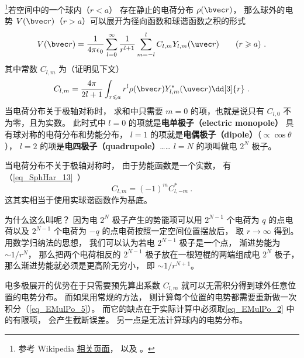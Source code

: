 

\footnote{参考 Wikipedia \href{https://en.wikipedia.org/wiki/Multipole_expansion}{相关页面}， 以及 \cite{Jackson}。}若空间中的一个球内（$r < a$） 存在静止的电荷分布 $\rho(\bvec r)$， 那么球外的电势 $V(\bvec r)$（$r > a$）可以展开为径向函数和球谐函数之积的形式
\begin{equation}\label{eq_EMulPo_2}
V(\bvec r) = \frac{1}{4\pi\epsilon_0}\sum_{l = 0}^\infty \frac{1}{r^{l+1}}\sum_{m = -l}^l C_{l,m} Y_{l,m}(\uvec r) \qquad (r \geqslant a)~.
\end{equation}
其中常数 $C_{l,m}$ 为（证明见下文）
\begin{equation}
C_{l,m} = \frac{4\pi}{2l+1} \int_{r\leqslant a} r^l \rho(\bvec r) Y_{l,m}^*(\uvec r) \dd[3]{r}~.
\end{equation}
当电荷分布关于极轴对称时， 求和中只需要 $m=0$ 的项，也就是说只有 $C_{l,0}$ 不为零，且为实数。 此时式中 $l = 0$ 的项就是\textbf{电单极子（electric monopole）} 具有球对称的电荷分布和势能分布， $l = 1$ 的项就是\textbf{电偶极子（dipole）}（$\propto\cos \theta$）， $l = 2$ 的项是\textbf{电四极子（quadrupole）}……  $l = N$ 的项叫做电 $2^N$ 极子。

当电荷分布不关于极轴对称时， 由于势能函数是一个实数， 有（\autoref{eq_SphHar_13}~）
\begin{equation}
C_{l,m} = (-1)^m C_{l,-m}^*~.
\end{equation}
这其实相当于使用实球谐函数作为基底。

为什么这么叫呢？ 因为电 $2^N$ 极子产生的势能项可以用 $2^{N-1}$ 个电荷为 $q$ 的点电荷以及 $2^{N-1}$ 个电荷为 $-q$ 的点电荷按照一定空间位置摆放后， 取 $r \to \infty$ 得到。 用数学归纳法的思想， 我们可以认为若电 $2^{N-1}$ 极子是一个点， 渐进势能为 $\sim 1/r^N$， 那么把两个电荷相反的 $2^{N-1}$ 极子放在一根短棍的两端组成电 $2^N$ 极子， 那么渐进势能就必须是更高阶无穷小， 即 $\sim 1/r^{N+1}$。

电多极展开的优势在于只需要预先算出系数 $C_{l,m}$ 就可以无需积分得到球外任意位置的电势分布。 而如果用常规的方法， 则计算每个位置的电势都需要重新做一次积分（\autoref{eq_EMulPo_5}）。 而它的缺点在于实际计算中必须取\autoref{eq_EMulPo_2} 中的有限项， 会产生截断误差。 另一点是无法计算球内的电势分布。

